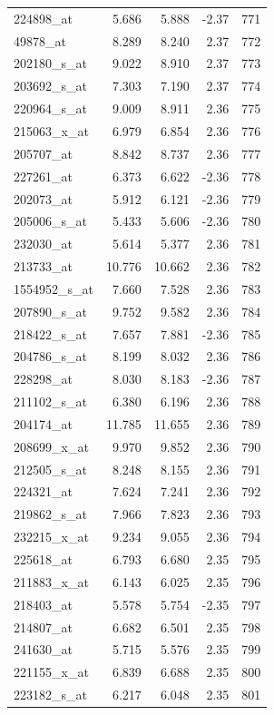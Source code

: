 \begin{footnotesize}
\begin{longtable}{lrrrr}
224898\_at & 5.686 & 5.888 & -2.37 & 771 \\
49878\_at & 8.289 & 8.240 & 2.37 & 772 \\
202180\_s\_at & 9.022 & 8.910 & 2.37 & 773 \\
203692\_s\_at & 7.303 & 7.190 & 2.37 & 774 \\
220964\_s\_at & 9.009 & 8.911 & 2.36 & 775 \\
215063\_x\_at & 6.979 & 6.854 & 2.36 & 776 \\
205707\_at & 8.842 & 8.737 & 2.36 & 777 \\
227261\_at & 6.373 & 6.622 & -2.36 & 778 \\
202073\_at & 5.912 & 6.121 & -2.36 & 779 \\
205006\_s\_at & 5.433 & 5.606 & -2.36 & 780 \\
232030\_at & 5.614 & 5.377 & 2.36 & 781 \\
213733\_at & 10.776 & 10.662 & 2.36 & 782 \\
1554952\_s\_at & 7.660 & 7.528 & 2.36 & 783 \\
207890\_s\_at & 9.752 & 9.582 & 2.36 & 784 \\
218422\_s\_at & 7.657 & 7.881 & -2.36 & 785 \\
204786\_s\_at & 8.199 & 8.032 & 2.36 & 786 \\
228298\_at & 8.030 & 8.183 & -2.36 & 787 \\
211102\_s\_at & 6.380 & 6.196 & 2.36 & 788 \\
204174\_at & 11.785 & 11.655 & 2.36 & 789 \\
208699\_x\_at & 9.970 & 9.852 & 2.36 & 790 \\
212505\_s\_at & 8.248 & 8.155 & 2.36 & 791 \\
224321\_at & 7.624 & 7.241 & 2.36 & 792 \\
219862\_s\_at & 7.966 & 7.823 & 2.36 & 793 \\
232215\_x\_at & 9.234 & 9.055 & 2.36 & 794 \\
225618\_at & 6.793 & 6.680 & 2.35 & 795 \\
211883\_x\_at & 6.143 & 6.025 & 2.35 & 796 \\
218403\_at & 5.578 & 5.754 & -2.35 & 797 \\
214807\_at & 6.682 & 6.501 & 2.35 & 798 \\
241630\_at & 5.715 & 5.576 & 2.35 & 799 \\
221155\_x\_at & 6.839 & 6.688 & 2.35 & 800 \\
223182\_s\_at & 6.217 & 6.048 & 2.35 & 801 \\

\end{longtable}
\end{footnotesize}
